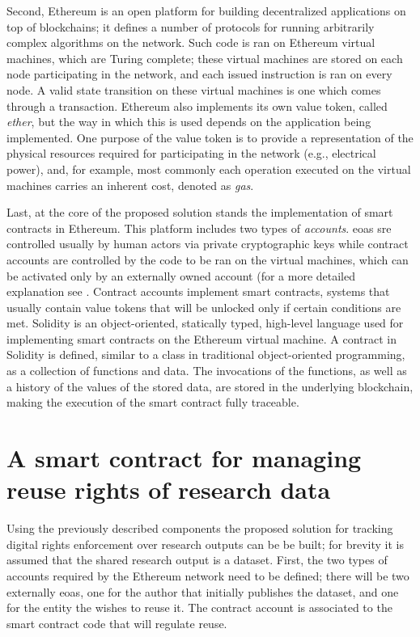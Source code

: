 Second, Ethereum is an open platform for building decentralized applications on top of blockchains; it defines a number of protocols for running arbitrarily complex algorithms on the network. Such code is ran on Ethereum virtual machines, which are Turing complete; these virtual machines are stored on each node participating in the network, and each issued instruction is ran on every node. A valid state transition on these virtual machines is one which comes through a transaction\cite{gavin}. Ethereum also implements its own value token, called \emph{ether}, but the way in which this is used depends on the application being implemented. One purpose of the value token is to provide a representation of the physical resources required for participating in the network (e.g., electrical power), and, for example, most commonly each operation executed on the virtual machines carries an inherent cost, denoted as \emph{gas}\cite{gavin}.

Last, at the core of the proposed solution stands the implementation of smart contracts in Ethereum. This platform includes two types of \emph{accounts}. \glspl{eoa} sre controlled usually by human actors via private cryptographic keys while contract accounts are controlled by the code to be ran on the virtual machines, which can be activated only by an externally owned account (for a more detailed explanation see \cite{ethdocs}. Contract accounts implement smart contracts, systems that usually contain value tokens that will be unlocked only if certain conditions are met. Solidity is an object-oriented, statically typed, high-level language used for implementing smart contracts on the Ethereum virtual machine\cite{solidity}. A contract in Solidity is defined, similar to a class in traditional object-oriented programming, as a collection of functions and data. The invocations of the functions, as well as a history of the values of the stored data, are stored in the underlying blockchain, making the execution of the smart contract fully traceable.

\section{A smart contract for managing reuse rights of research data}
\label{sec:smart}

Using the previously described components the proposed solution for tracking digital rights enforcement over research outputs can be be built; for brevity it is assumed that the shared research output is a dataset. First, the two types of accounts required by the Ethereum network need to be defined; there will be two externally \glspl{eoa}, one for the author that initially publishes the dataset, and one for the entity the wishes to reuse it. The contract account is associated to the smart contract code that will regulate reuse.

